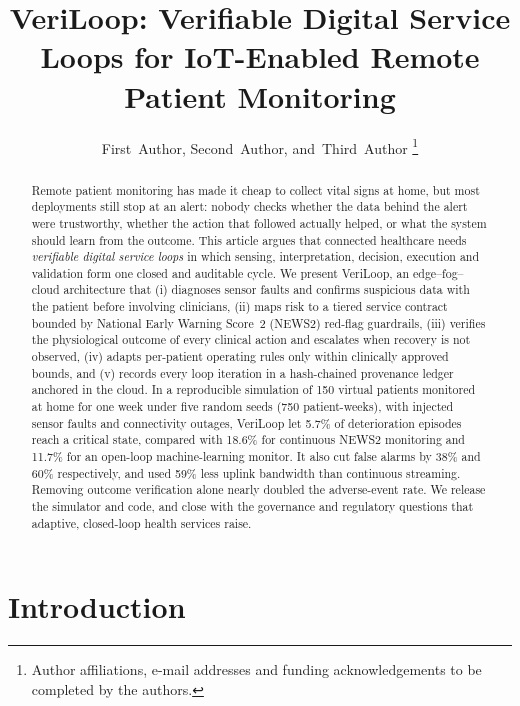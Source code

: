 \documentclass[journal]{IEEEtran}
\begin{document}
\title{VeriLoop: Verifiable Digital Service Loops for IoT-Enabled Remote Patient Monitoring}

\author{%
First~Author,
Second~Author,
and~Third~Author%
\thanks{Author affiliations, e-mail addresses and funding acknowledgements to be completed by the authors.}%
}

\maketitle

\begin{abstract}
Remote patient monitoring has made it cheap to collect vital signs at home, but most deployments still stop at an alert:
nobody checks whether the data behind the alert were trustworthy, whether the action that followed actually helped, or
what the system should learn from the outcome. This article argues that connected healthcare needs \emph{verifiable
digital service loops} in which sensing, interpretation, decision, execution and validation form one closed and
auditable cycle. We present VeriLoop, an edge--fog--cloud architecture that (i) diagnoses sensor faults and confirms
suspicious data with the patient before involving clinicians, (ii) maps risk to a tiered service contract bounded by
National Early Warning Score~2 (NEWS2) red-flag guardrails, (iii) verifies the physiological outcome of every clinical
action and escalates when recovery is not observed, (iv) adapts per-patient operating rules only within clinically
approved bounds, and (v) records every loop iteration in a hash-chained provenance ledger anchored in the cloud. In a
reproducible simulation of 150 virtual patients monitored at home for one week under five random seeds (750 patient-weeks), with injected sensor faults and
connectivity outages, VeriLoop let 5.7\% of deterioration episodes reach a critical state, compared with 18.6\% for
continuous NEWS2 monitoring and 11.7\% for an open-loop machine-learning monitor. It also cut false alarms by 38\% and
60\% respectively, and used 59\% less uplink bandwidth than continuous streaming. Removing outcome verification alone
nearly doubled the adverse-event rate. We release the simulator and code, and close with the governance and
regulatory questions that adaptive, closed-loop health services raise.
\end{abstract}

\section*{Introduction}
\end{document}
